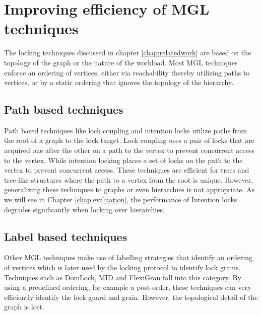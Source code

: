 \section{Improving efficiency of MGL techniques}

The locking techniques discussed in chapter \ref{chap:relatedwork} are based on the topology of the graph or the nature of the workload. Most MGL techniques enforce an ordering of vertices, either via reachability thereby utilizing paths to vertices, or by a static ordering that ignores the topology of the hierarchy.

\subsection{Path based techniques}
Path based techniques like lock coupling \cite{DBLP:journals/acta/BayerS77}  and intention locks \cite{gray1975granularity} utilize paths from the root of a graph to the lock target. Lock coupling uses a pair of locks that are acquired one after the other on a path to the vertex to prevent concurrent access to the vertex. While intention locking places a set of locks on the path to the vertex to prevent concurrent access. These techniques are efficient for trees and tree-like structures where the path to a vertex from the root is unique. However, generalizing these techniques to graphs or even hierarchies is not appropriate. As we will see in Chapter \ref{chap:evaluation}, the performance of Intention locks degrades significantly when locking over hierarchies.

\subsection{Label based techniques}
Other MGL techniques make use of labelling strategies that identify an ordering of vertices which is later used by the locking protocol to identify lock grains. Techniques such as DomLock, MID and FlexiGran fall into this category. By using a predefined ordering, for example a post-order, these techniques can very efficiently identify the lock guard and grain. However, the topological detail of the graph is lost.  


